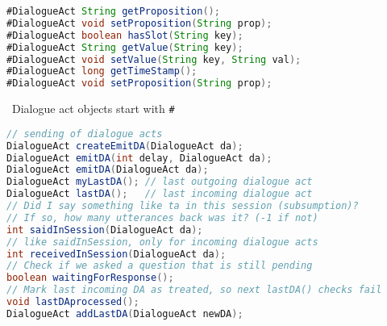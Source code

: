 \documentclass[5pt]{article}
\newcommand{\intitle}[1]{\rule{0pt}{2ex}\ #1}
\begin{document}
\begin{multicols}{2}
\begin{bodybox}{}
\begin{lstlisting}[language=Java]
#DialogueAct String getProposition();
#DialogueAct void setProposition(String prop);
#DialogueAct boolean hasSlot(String key);
#DialogueAct String getValue(String key);
#DialogueAct void setValue(String key, String val);
#DialogueAct long getTimeStamp();
#DialogueAct void setProposition(String prop);
        \end{lstlisting}
        \intitle{Dialogue act objects start with \texttt{\#}}
        \begin{lstlisting}[language=Java]
// sending of dialogue acts
DialogueAct createEmitDA(DialogueAct da);
DialogueAct emitDA(int delay, DialogueAct da);
DialogueAct emitDA(DialogueAct da);
DialogueAct myLastDA(); // last outgoing dialogue act
DialogueAct lastDA();   // last incoming dialogue act
// Did I say something like ta in this session (subsumption)?
// If so, how many utterances back was it? (-1 if not)
int saidInSession(DialogueAct da);
// like saidInSession, only for incoming dialogue acts
int receivedInSession(DialogueAct da);
// Check if we asked a question that is still pending
boolean waitingForResponse();
// Mark last incoming DA as treated, so next lastDA() checks fail
void lastDAprocessed();
DialogueAct addLastDA(DialogueAct newDA);
        \end{lstlisting}
        \end{bodybox}
    \end{multicols}
\end{document}
